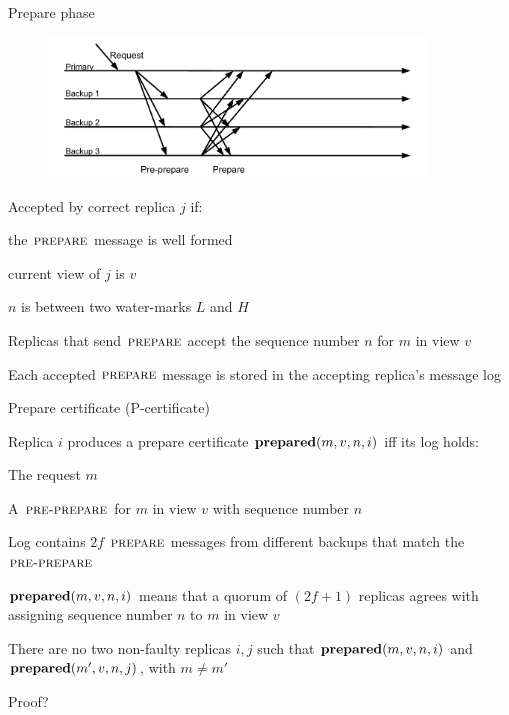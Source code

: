 \begin{frame}{Prepare phase}

\begin{figure}
\includegraphics[width=0.9\textwidth, trim=0 20 0 60]{figs/14/messages2}
\end{figure}
\begin{overprint}
\BI
\item Accepted by correct replica $j$ if:
\BI
\item the $\textsc{prepare}$ message is well formed
\item current view of $j$ is $v$
\item $n$ is between two water-marks $L$ and $H$
\EI
\EI

\BI
\item Replicas that send $\textsc{prepare}$ accept the sequence number $n$ for $m$ in view $v$
\item Each accepted $\textsc{prepare}$ message is stored in the accepting replica's message log
\EI

\end{overprint}
\end{frame}

\begin{frame}{Prepare certificate (P-certificate)}

\BIL
\item Replica $i$ produces a \alert{prepare certificate} $\mathbf{prepared}(m,v,n,i)$ iff its log holds:
	\BI
	\item The request $m$
	\item A $\textsc{pre-prepare}$ for $m$ in view $v$ with sequence number $n$
	\item Log contains $2f$ $\textsc{prepare}$ messages from different backups that match the $\textsc{pre-prepare}$
	\EI
\item $\mathbf{prepared}(m,v,n,i)$ means that a quorum of \alert{$(2f+1)$} replicas agrees with assigning sequence number $n$ to $m$ in view $v$
\EIL

\smallskip
\begin{theorem}
There are no two non-faulty replicas $i, j$ such that $\mathbf{prepared}(m, v, n, i)$
and $\mathbf{prepared}(m',v , n, j)$, with $m \neq m'$
\end{theorem}

\smallskip
Proof?

\end{frame}

